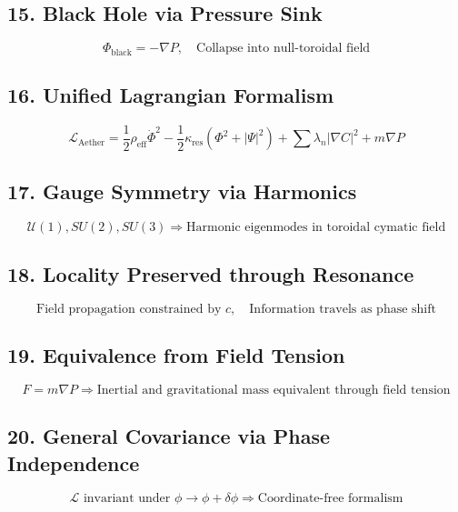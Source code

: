 \documentclass[12pt]{article}
\begin{document}
\subsection*{15. Black Hole via Pressure Sink}
\[
\Phi_{\text{black}} = -\nabla P, \quad \text{Collapse into null-toroidal field}
\]

\subsection*{16. Unified Lagrangian Formalism}
\[
\mathcal{L}_{\text{Aether}} = \frac{1}{2} \rho_{\text{eff}} \dot{\Phi}^2 - \frac{1}{2} \kappa_{\text{res}}(\Phi^2 + |\Psi|^2) + \sum \lambda_n |\nabla C|^2 + m \nabla P
\]

\subsection*{17. Gauge Symmetry via Harmonics}
\[
\mathcal{U}(1), SU(2), SU(3) \Rightarrow \text{Harmonic eigenmodes in toroidal cymatic field}
\]

\subsection*{18. Locality Preserved through Resonance}
\[
\text{Field propagation constrained by } c, \quad \text{Information travels as phase shift}
\]

\subsection*{19. Equivalence from Field Tension}
\[
F = m \nabla P \Rightarrow \text{Inertial and gravitational mass equivalent through field tension}
\]

\subsection*{20. General Covariance via Phase Independence}
\[
\mathcal{L} \text{ invariant under } \phi \rightarrow \phi + \delta\phi \Rightarrow \text{Coordinate-free formalism}
\]
\end{document}
